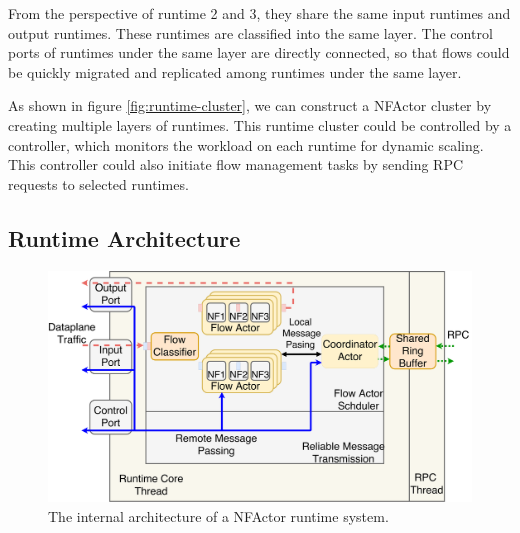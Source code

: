 
From the perspective of runtime 2 and 3, they share the same input runtimes and output runtimes. These runtimes are classified into the same layer. The control ports of runtimes under the same layer are directly connected, so that flows could be quickly migrated and replicated among runtimes under the same layer.


As shown in figure \ref{fig:runtime-cluster}, we can construct a NFActor cluster by creating multiple layers of runtimes. This runtime cluster could be controlled by a controller, which monitors the workload on each runtime for dynamic scaling. This controller could also initiate flow management tasks by sending RPC requests to selected runtimes.

\subsection{Runtime Architecture}

\begin{figure}
		\centering
		\includegraphics[width=\columnwidth]{figure/nfactor-runtime-arch.pdf}

		\caption{The internal architecture of a NFActor runtime system. }
\label{fig:runtime-arch}
\end{figure}

